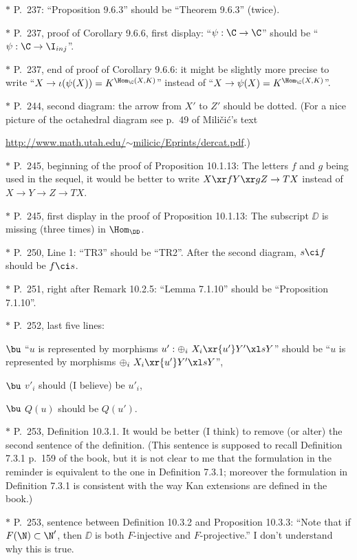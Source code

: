 \documentclass[12pt]{article}
\theoremstyle{remark}
\theoremstyle{definition}
\begin{document}
\nn$*$ P.~237: ``Proposition 9.6.3'' should be ``Theorem 9.6.3'' (twice). 

\nn$*$ P.~237, proof of Corollary 9.6.6, first display: ``$\psi:\C\to\C$'' should be ``$\psi:\C\to\I_{inj}$''. 

\nn$*$ P.~237, end of proof of Corollary 9.6.6: it might be slightly more precise to write ``$X\to\iota(\psi(X))=K^{\Hom_\C(X,K)}$'' instead of ``$X\to\psi(X)=K^{\Hom_\C(X,K)}$''.

\nn$*$ P.~244, second diagram: the arrow from $X'$ to $Z'$ should be dotted. (For a nice picture of the octahedral diagram see p.~49 of Mili\v{c}i\'c's text

\href{http://www.math.utah.edu/~milicic/Eprints/dercat.pdf}{http://www.math.utah.edu/$\sim$milicic/Eprints/dercat.pdf}.)

\nn$*$ P.~245, beginning of the proof of Proposition 10.1.13: The letters $f$ and $g$ being used in the sequel, it would be better to write $X\xr fY\xr gZ\to TX$ instead of $X\to Y\to Z\to TX$. 

\nn$*$ P.~245, first display in the proof of Proposition 10.1.13: The subscript $\DD$ is missing (three times) in $\Hom_\DD$.

\nn$*$ P.~250, Line 1: ``TR3'' should be ``TR2''. After the second diagram, $s\ci f$ should be $f\ci s$.

\nn$*$ P.~251, right after Remark 10.2.5: ``Lemma 7.1.10'' should be ``Proposition 7.1.10''.

\nn$*$ P.~252, last five lines:

$\bu$ ``$u$ is represented by morphisms $u':\oplus_i\ X_i\xr{u'}Y'\xl sY$'' should be ``$u$ is represented by morphisms $\oplus_i\ X_i\xr{u'}Y'\xl sY$'',

$\bu$ $v'_i$ should (I believe) be $u'_i$,

$\bu$ $Q(u)$ should be $Q(u')$.

\nn$*$ P.~253, Definition 10.3.1. It would be better (I think) to remove (or alter) the second sentence of the definition. (This sentence is supposed to recall Definition 7.3.1 p.~159 of the book, but it is not clear to me that the formulation in the reminder is equivalent to the one in Definition 7.3.1; moreover the formulation in Definition 7.3.1 is consistent with the way Kan extensions are defined in the book.)

\nn$*$ P.~253, sentence between Definition 10.3.2 and Proposition 10.3.3: ``Note that if $F(\N)\subset\N'$, then $\DD$ is both $F$-injective and $F$-projective.'' I don't understand why this is true.
\end{document}
